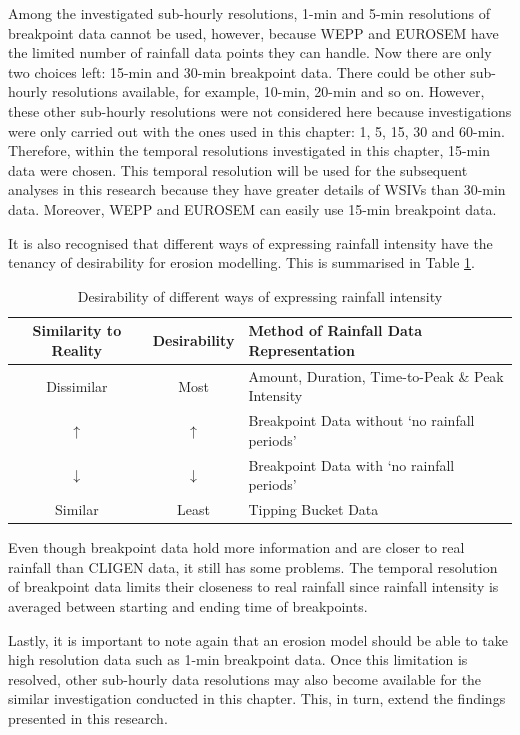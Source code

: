 Among the investigated sub-hourly resolutions, 1-min and 5-min resolutions of
breakpoint data cannot be used, however, because WEPP and EUROSEM have the
limited number of rainfall data points they can handle. Now there are only two
choices left: 15-min and 30-min breakpoint data.
There could be other sub-hourly resolutions available, for example, 10-min,
20-min and so on. However, these other sub-hourly resolutions were not
considered here because investigations were only carried out with the ones used
in this chapter: 1, 5, 15, 30 and 60-min. Therefore, within the temporal
resolutions investigated in this chapter, 15-min data were chosen. This temporal
resolution will be used for the subsequent analyses in this research because
they have greater details of WSIVs than 30-min data. Moreover, WEPP and EUROSEM
can easily use 15-min breakpoint data.

It is also recognised that different ways of expressing rainfall intensity have
the tenancy of desirability for erosion modelling. This is summarised in Table
\ref{tab:DesirabilityOfDifferentWaysOfExpressingRainfallIntensity}.

\begin{table}[htbp]
  \small
  \centering
      \caption{Desirability of different ways of expressing rainfall intensity}
  \label{tab:DesirabilityOfDifferentWaysOfExpressingRainfallIntensity}
    \begin{tabular}{ccl}
    \toprule
    Similarity to Reality & Desirability & Method of Rainfall Data
Representation\\
    \midrule
    Dissimilar & Most & Amount, Duration, Time-to-Peak \& Peak Intensity\\
    $\uparrow$ & $\uparrow$ &  Breakpoint Data without `no rainfall periods'\\
    $\downarrow$ & $\downarrow$ &  Breakpoint Data with `no rainfall periods'\\
    Similar & Least & Tipping Bucket Data\\
    \bottomrule
    \end{tabular}
\end{table}

Even though breakpoint data hold more information and are closer to real
rainfall than CLIGEN data, it still has some problems. The temporal resolution
of breakpoint data limits their closeness to real rainfall since rainfall
intensity is averaged between starting and ending time of breakpoints.

Lastly, it is important to note again that an erosion model should be able
to take high resolution data such as 1-min breakpoint data. Once this
limitation is resolved, other sub-hourly data resolutions may also become
available for the similar investigation conducted in this chapter. This, in
turn, extend the findings presented in this research.

